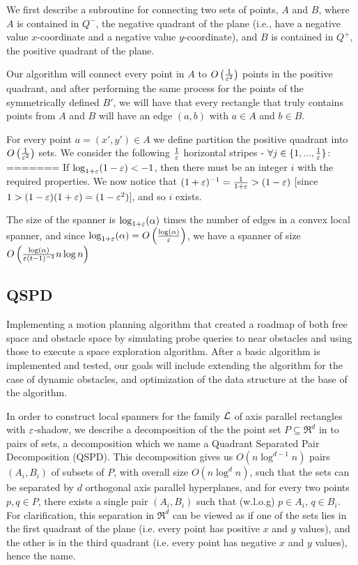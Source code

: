 \documentclass[12pt]{article}%
\begin{document}
We first describe a subroutine for connecting two sets of points, $A$
and $B$, where $A$ is contained in $Q^-$, the negative quadrant of the
plane (i.e., have a negative value $x$-coordinate and a negative value
$y$-coordinate), and $B$ is contained in $Q^+$, the positive quadrant
of the plane.

Our algorithm will connect every point in $A$ to
$O\left(\frac{1}{\varepsilon^2}\right)$ points in the positive quadrant, and
after performing the same process for the points of the symmetrically
defined $B'$, we will have that every rectangle that truly contains
points from $A$ and $B$ will have an edge $(a,b)$ with $a\in A$ and
$b\in B$.

For every point $a = (x',y') \in A$ we define partition the positive
quadrant into $O\left(\frac{1}{\varepsilon^2}\right)$ sets. We consider the
following $\frac{1}{\varepsilon}$ horizontal stripes -
$\forall j\in \{1,...,\frac{1}{\varepsilon}\}$:
=======
If $\log_{1+\varepsilon}(1-\varepsilon)<-1$, then there must be an integer $i$ with the required properties. We now notice that $(1+\varepsilon)^{-1}=\frac{1}{1+\varepsilon}>(1-\varepsilon)$ [since $1>(1-\varepsilon)(1+\varepsilon)=(1-\varepsilon^2)$], and so $i$ exists.

The size of the spanner is $\log_{1+\varepsilon}(\alpha)$ times the number of edges in a convex local spanner, and since $\log_{1+\varepsilon}(\alpha)=O\left(\frac{\log(\alpha)}{\varepsilon}\right)$, we have a spanner of size $O\left(\frac{\log(\alpha)}{\varepsilon (t-1)^{-3}}n\log n\right)$

\subsection{QSPD}
Implementing a motion planning algorithm that created a roadmap of both free space and obstacle space by simulating probe queries to near obstacles and using those to execute a space exploration algorithm.
After a basic algorithm is implemented and tested, our goals will include extending the algorithm for the case of dynamic obstacles, and optimization of the data structure at the base of the algorithm.

In order to construct local spanners for the family $\mathcal{L}$ of axis parallel rectangles with $\varepsilon$-shadow, we describe a decomposition of the the point set $P\subseteq \Re^d$ in to pairs of sets, a decomposition which we name a Quadrant Separated Pair Decomposition (QSPD). This decomposition gives us $O(n\log^{d-1}n)$ pairs $(A_i,B_i)$ of subsets of $P$, with overall size $O(n\log^{d}n)$, such that the sets can be separated by $d$ orthogonal axis parallel hyperplanes, and for every two points $p,q\in P$, there exists a single pair $(A_i,B_i)$ such that (w.l.o.g) $p\in A_i$, $q\in B_i$. For clarification, this separation in $\Re^d$ can be viewed as if one of the sets lies in the first quadrant of the plane (i.e. every point has positive $x$ and $y$ values), and the other is in the third quadrant (i.e. every point has negative $x$ and $y$ values), hence the name.
\end{document}
